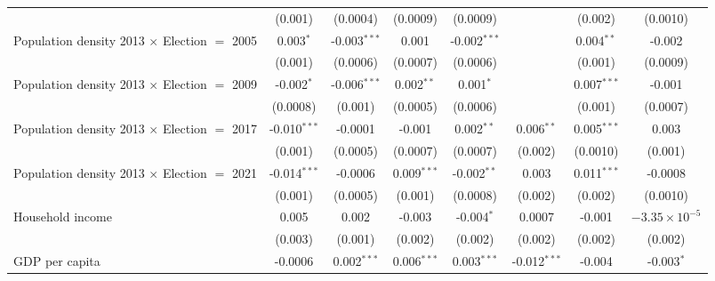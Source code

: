 \begin{table}[htbp]
\begin{tabular}{lccccccc}
                                                              & (0.001)        & (0.0004)       & (0.0009)               & (0.0009)       &                & (0.002)        & (0.0010)\\   
      Population density 2013 $\times$ Election $=$ 2005      & 0.003$^{*}$    & -0.003$^{***}$ & 0.001                  & -0.002$^{***}$ &                & 0.004$^{**}$   & -0.002\\   
                                                              & (0.001)        & (0.0006)       & (0.0007)               & (0.0006)       &                & (0.001)        & (0.0009)\\   
      Population density 2013 $\times$ Election $=$ 2009      & -0.002$^{*}$   & -0.006$^{***}$ & 0.002$^{**}$           & 0.001$^{*}$    &                & 0.007$^{***}$  & -0.001\\   
                                                              & (0.0008)       & (0.001)        & (0.0005)               & (0.0006)       &                & (0.001)        & (0.0007)\\   
      Population density 2013 $\times$ Election $=$ 2017      & -0.010$^{***}$ & -0.0001        & -0.001                 & 0.002$^{**}$   & 0.006$^{**}$   & 0.005$^{***}$  & 0.003\\   
                                                              & (0.001)        & (0.0005)       & (0.0007)               & (0.0007)       & (0.002)        & (0.0010)       & (0.001)\\   
      Population density 2013 $\times$ Election $=$ 2021      & -0.014$^{***}$ & -0.0006        & 0.009$^{***}$          & -0.002$^{**}$  & 0.003          & 0.011$^{***}$  & -0.0008\\   
                                                              & (0.001)        & (0.0005)       & (0.001)                & (0.0008)       & (0.002)        & (0.002)        & (0.0010)\\   
      Household income                                        & 0.005          & 0.002          & -0.003                 & -0.004$^{*}$   & 0.0007         & -0.001         & $-3.35\times 10^{-5}$\\    
                                                              & (0.003)        & (0.001)        & (0.002)                & (0.002)        & (0.002)        & (0.002)        & (0.002)\\   
      GDP per capita                                          & -0.0006        & 0.002$^{***}$  & 0.006$^{***}$          & 0.003$^{***}$  & -0.012$^{***}$ & -0.004         & -0.003$^{*}$\\   

\end{tabular}
\end{table}
